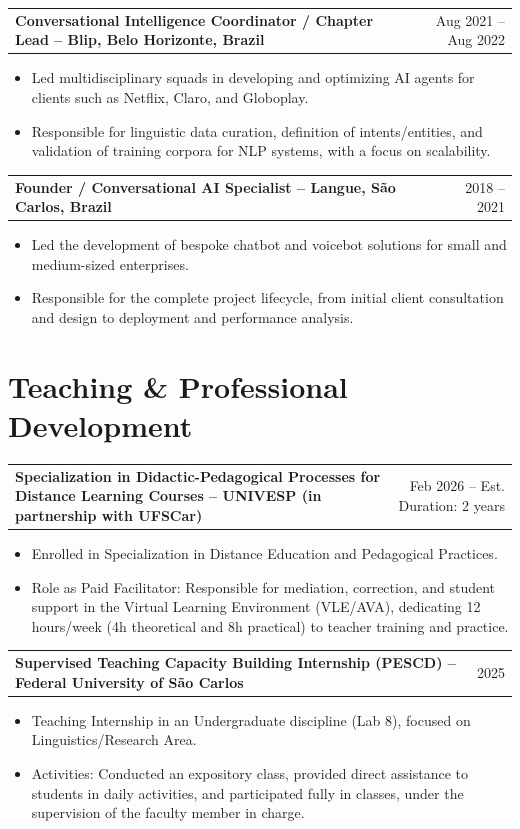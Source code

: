 \documentclass[a4paper]{article}
\makeatletter
\newenvironment{joblong}[2]
    {
    \begin{tabularx}{\linewidth}{@{}X r@{}}
    \textbf{#1} & #2 \\[3.75pt]
    \end{tabularx}
    \begin{minipage}[t]{\linewidth}
    \begin{itemize}[nosep,after=\strut, leftmargin=1em, itemsep=3pt,label=--]
    }
    {
    \end{itemize}
    \end{minipage}
    }
\makeatother
\begin{document}
\begin{joblong}{Conversational Intelligence Coordinator / Chapter Lead -- Blip, Belo Horizonte, Brazil}{Aug 2021 – Aug 2022}
\item Led multidisciplinary squads in developing and optimizing AI agents for clients such as Netflix, Claro, and Globoplay.
\item Responsible for linguistic data curation, definition of intents/entities, and validation of training corpora for NLP systems, with a focus on scalability.
\end{joblong}

\begin{joblong}{Founder / Conversational AI Specialist -- Langue, São Carlos, Brazil}{2018 – 2021}
\item Led the development of bespoke chatbot and voicebot solutions for small and medium-sized enterprises.
\item Responsible for the complete project lifecycle, from initial client consultation and design to deployment and performance analysis.
\end{joblong}


\section{Teaching \& Professional Development}

\begin{joblong}{Specialization in Didactic-Pedagogical Processes for Distance Learning Courses -- UNIVESP (in partnership with UFSCar)}{Feb 2026 – Est. Duration: 2 years}
\item Enrolled in Specialization in Distance Education and Pedagogical Practices.
\item Role as Paid Facilitator: Responsible for mediation, correction, and student support in the Virtual Learning Environment (VLE/AVA), dedicating 12 hours/week (4h theoretical and 8h practical) to teacher training and practice.
\end{joblong}

\begin{joblong}{Supervised Teaching Capacity Building Internship (PESCD) -- Federal University of São Carlos}{2025}
\item Teaching Internship in an Undergraduate discipline (Lab 8), focused on Linguistics/Research Area.
\item Activities: Conducted an expository class, provided direct assistance to students in daily activities, and participated fully in classes, under the supervision of the faculty member in charge.
\end{joblong}
\end{document}
